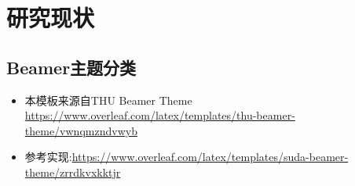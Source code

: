 \section{研究现状}

\subsection{Beamer主题分类}

\begin{frame}
    \begin{itemize}
        \item 本模板来源自THU Beamer Theme \newline \url{https://www.overleaf.com/latex/templates/thu-beamer-theme/vwnqmzndvwyb}
        \item 参考实现:\newline \url{https://www.overleaf.com/latex/templates/suda-beamer-theme/zrrdkvxkktjr}
    \end{itemize}
\end{frame}